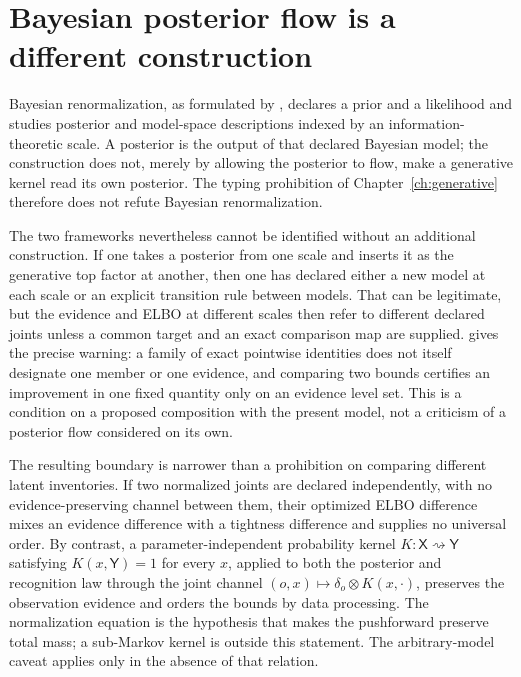 \section{Bayesian posterior flow is a different construction}
\label{sec:obs-tau}

Bayesian renormalization, as formulated by \citet{BermanKlingerStapleton2023}, declares a prior and a likelihood and studies posterior and model-space descriptions indexed by an information-theoretic scale. A posterior is the output of that declared Bayesian model; the construction does not, merely by allowing the posterior to flow, make a generative kernel read its own posterior. The typing prohibition of Chapter~\ref{ch:generative} therefore does not refute Bayesian renormalization. 

The two frameworks nevertheless cannot be identified without an additional construction. If one takes a posterior from one scale and inserts it as the generative top factor at another, then one has declared either a new model at each scale or an explicit transition rule between models. That can be legitimate, but the evidence and ELBO at different scales then refer to different declared joints unless a common target and an exact comparison map are supplied.  gives the precise warning: a family of exact pointwise identities does not itself designate one member or one evidence, and comparing two bounds certifies an improvement in one fixed quantity only on an evidence level set. This is a condition on a proposed composition with the present model, not a criticism of a posterior flow considered on its own. 

The resulting boundary is narrower than a prohibition on comparing different
latent inventories. If two normalized joints are declared independently, with
no evidence-preserving channel between them, their optimized ELBO difference
mixes an evidence difference with a tightness difference and supplies no
universal order. By contrast, a parameter-independent probability kernel
$K:\mathsf X\rightsquigarrow\mathsf Y$ satisfying
$K(x,\mathsf Y)=1$ for every $x$, applied to both the posterior and
recognition law through the joint channel
$(o,x)\mapsto\delta_o\otimes K(x,\cdot)$, preserves the observation evidence and orders the
bounds by data processing.  The normalization equation is the hypothesis that makes
the pushforward preserve total mass; a sub-Markov kernel is outside this
statement. The arbitrary-model caveat applies only in the absence of that
relation. 

